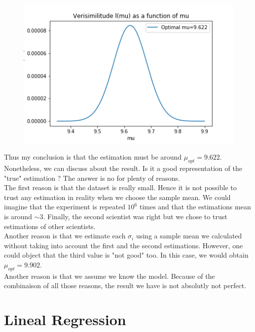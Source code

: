 \documentclass{article}
\begin{document}
\begin{figure}[h]
  \centering
  \includegraphics[scale = 0.55]{img/graph_veri_without2esti.png}
\end{figure}

Thus my conclusion is that the estimation must be around $\mu_{opt} = 9.622$. Nonetheless, we can discuss about the result. Is it a good representation  of the "true" estimation ? The answer is no for plenty of reasons. \\

The first reason is that the dataset is really small. Hence it is not possible to trust any estimation in reality when we choose the sample mean. We could imagine that the experiment is repeated $10^6$ times and that the estimations mean is around $\sim 3$. Finally, the second scientist was right but we chose to trust estimations of other scientists.\\

Another reason is that we estimate each $\sigma_i$ using a sample mean we calculated without taking into account the first and the second estimations. However, one could object that the third value is "not good" too. In this case, we would obtain $\mu_{opt} = 9.902$.\\

Another reason is that we assume we know the model. Because of the combinaison of all those reasons, the result we have is not absolutly not perfect.

\section{Lineal Regression}
\end{document}
